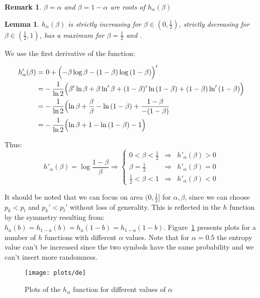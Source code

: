 \documentclass[9pt,a4paper]{article}
\newtheorem{lemma}[thm]{Lemma}
\newtheorem{remark}[thm]{Remark}
\begin{document}
\begin{remark}
    $\beta = \alpha$ and $\beta = 1 - \alpha$ are roots of $h_\alpha(\beta)$ 
\end{remark}

\begin{lemma}
    $h_\alpha(\beta)$ is strictly increasing for $\beta \in (0,\frac{1}{2})$,
    strictly decreasing for $\beta \in (\frac{1}{2},1)$, has a maximum
    for $\beta = \frac{1}{2}$ and .
\end{lemma}

We use the first derivative of the function:

\begin{align*}
    h'_\alpha(\beta) = &
     \ 0 + \Bigl( - \beta\log{\beta}  - (1-\beta)\log{(1-\beta)} \Bigr)' \\
     = & - \frac{1}{\ln{2}} \Bigl( 
        \beta'\ln{\beta} + \beta\ln'{\beta} +(1-\beta)'\ln{(1-\beta)} + (1-\beta)\ln'{(1-\beta)}
     \Bigr) \\
     = & - \frac{1}{\ln{2}} \Bigl( 
        \ln{\beta} + \frac{\beta}{\beta} - \ln{(1-\beta)} + \frac{1-\beta}{-(1-\beta)} \\
      = & - \frac{1}{\ln{2}} \Bigl( 
        \ln{\beta} + 1 - \ln{(1-\beta)} -1
     \Bigr)
\end{align*}

Thus:
\begin{equation}
h'_\alpha(\beta) = \log{\frac{1-\beta}{\beta}} \Rightarrow
    \left\{ \begin{array}{lll}
        0 < \beta < \frac{1}{2} & \Rightarrow & h'_\alpha(\beta) > 0 \\
        \beta = \frac{1}{2} &\Rightarrow& h'_\alpha(\beta) = 0 \\
        \frac{1}{2} < \beta < 1 &\Rightarrow& h'_\alpha(\beta) < 0 
    \end{array} \right.
\end{equation}

It should be noted that we can focus on area $(0,\frac{1}{2}]$ for $\alpha,
\beta$, since we can choose $p_k<p_l$ and $p_k'<p_l'$ without loss of
generality. This is reflected in the $h$ function by the symmetry resulting
from: $h_a(b) = h_{1-a}(b) = h_a(1-b) = h_{1-a}(1-b)$. Figure~\ref{fig:de-plot}
presents plots for a number of $h$ functions with different $\alpha$ values.
Note that for $\alpha = 0.5$ the entropy value can't be increased since the two
symbols have the same probability and we can't insert more randomness.

\begin{figure}[h]
    \texttt{[image: plots/de]}
    \caption{Plots of the $h_\alpha$ function for different values of $\alpha$}
    \label{fig:de-plot}
\end{figure}
\end{document}
